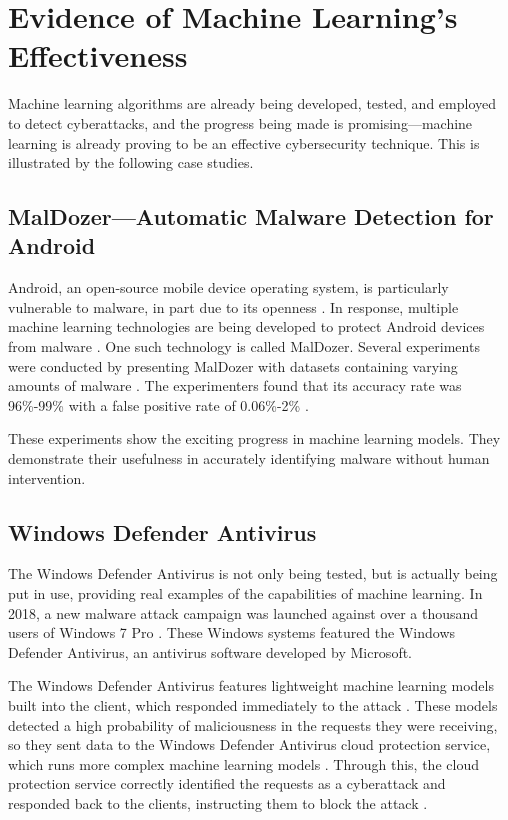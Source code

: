 \section{Evidence of Machine Learning's Effectiveness}
Machine learning algorithms are already being developed, tested, and employed to detect cyberattacks, and the progress being made is promising---machine learning is already proving to be an effective cybersecurity technique.
This is illustrated by the following case studies.

\subsection{MalDozer---Automatic Malware Detection for Android}
Android, an open-source mobile device operating system, is particularly vulnerable to malware, in part due to its openness \cite{sustainablecities2021}.
In response, multiple machine learning technologies are being developed to protect Android devices from malware \cite{sustainablecities2021}.
One such technology is called MalDozer.
Several experiments were conducted by presenting MalDozer with datasets containing varying amounts of malware \cite{sustainablecities2021}.
The experimenters found that its accuracy rate was 96\%-99\% with a false positive rate of 0.06\%-2\% \cite{sustainablecities2021}.

These experiments show the exciting progress in machine learning models.
They demonstrate their usefulness in accurately identifying malware without human intervention.

\subsection{Windows Defender Antivirus}
The Windows Defender Antivirus is not only being tested, but is actually being put in use, providing real examples of the capabilities of machine learning.
In 2018, a new malware attack campaign was launched against over a thousand users of Windows 7 Pro \cite{microsoft2018}.
These Windows systems featured the Windows Defender Antivirus, an antivirus software developed by Microsoft.

The Windows Defender Antivirus features lightweight machine learning models built into the client, which responded immediately to the attack \cite{microsoft2018}.
These models detected a high probability of maliciousness in the requests they were receiving, so they sent data to the Windows Defender Antivirus cloud protection service, which runs more complex machine learning models \cite{microsoft2018}.
Through this, the cloud protection service correctly identified the requests as a cyberattack and responded back to the clients, instructing them to block the attack \cite{microsoft2018}.

